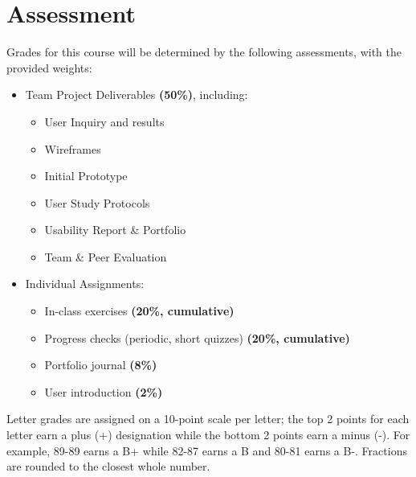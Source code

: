 \documentclass[12pt]{article}
\begin{document}
  \section*{Assessment}
  \noindent
  Grades for this course will be determined by the following assessments, with the provided weights:
  \begin{itemize}
    \item Team Project Deliverables \textbf{(50\%)}, including:\hfill
      \begin{itemize}
        \item User Inquiry and results 
        \item Wireframes
        \item Initial Prototype
        \item User Study Protocols
        \item Usability Report \& Portfolio
        \item Team \& Peer Evaluation
      \end{itemize}
    \item Individual Assignments:\hfill
      \begin{itemize}
        \item In-class exercises \textbf{(20\%, cumulative)}
        \item Progress checks (periodic, short quizzes) \textbf{(20\%, cumulative)}
        \item Portfolio journal \textbf{(8\%)}
        \item User introduction \textbf{(2\%)}
      \end{itemize}
  \end{itemize}

  Letter grades are assigned on a 10-point scale per letter; the top 2 points for each letter earn a plus (+) designation while the bottom 2 points earn a minus (-). For example, 89-89 earns a B+ while 82-87 earns a B and 80-81 earns a B-. Fractions are rounded to the closest whole number.
  
\end{document}
